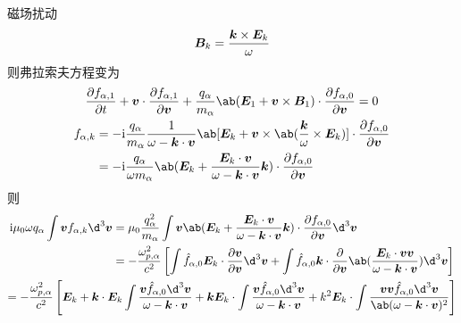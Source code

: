 磁场扰动
\begin{equation}
\bm{B}_k = \frac{\bm{k} \times \bm{E}_k}{\omega}
\end{equation}
则弗拉索夫方程变为
\begin{equation}\begin{gathered}
\pdv{f_{\alpha,1}}{t}
+ \vector{v} \cdot \pdv{f_{\alpha,1}}{\vector{v}}
+ \frac{q_\alpha}{m_\alpha} \ab(\vector{E}_1 + \vector{v}\times\vector{B}_1)
\cdot \pdv{f_{\alpha,0}}{\vector{v}}
= 0 \\
\begin{aligned}
f_{\alpha,k} &= -\im \frac{q_\alpha}{m_\alpha}
\frac{1}{\omega - \vector{k}\cdot\vector{v}} \ab[
\vector{E}_k + \vector{v} \times
\ab(\frac{\vector{k}}{\omega} \times \vector{E}_k)]
\cdot \pdv{f_{\alpha,0}}{\vector{v}} \\
&= -\im \frac{q_\alpha}{\omega m_\alpha} \ab(
    \vector{E}_k + \frac{\vector{E}_k \cdot \vector{v}}
    {\omega - \vector{k}\cdot\vector{v}} \vector{k}
) \cdot \pdv{f_{\alpha,0}}{\vector{v}}
\end{aligned}
\end{gathered}\end{equation}
则
\begin{equation}\begin{gathered}\begin{aligned}
\im\mu_0\omega q_\alpha \int \vector{v} f_{\alpha,k} \d^3\vector{v}
&= \mu_0 \frac{q_\alpha^2}{m_\alpha}
\int \vector{v} \ab(
    \vector{E}_k + \frac{\vector{E}_k \cdot \vector{v}}
    {\omega - \vector{k}\cdot\vector{v}} \vector{k}
)
\cdot \pdv{f_{\alpha,0}}{\vector{v}} \d^3\vector{v} \\
&= - \frac{\omega_{p,\alpha}^2}{c^2} \left[
\int \hat{f}_{\alpha,0} \vector{E}_k \cdot \pdv{\vector{v}}{\vector{v}} \d^3\vector{v}
+ \int \hat{f}_{\alpha,0} \vector{k} \cdot
    \pdv*{\ab(\frac{\vector{E}_k \cdot \vector{v}\vector{v}}
    {\omega-\vector{k}\cdot\vector{v}})}{\vector{v}}
\d^3\vector{v}
\right]\end{aligned} \\
= - \frac{\omega_{p,\alpha}^2}{c^2} \left[ \vector{E}_k
+ \vector{k} \cdot \vector{E}_k \int
    \frac{\vector{v} \hat{f}_{\alpha,0} \d^3\vector{v}}
    {\omega-\vector{k}\cdot\vector{v}}
+ \vector{k} \vector{E}_k \cdot \int
    \frac{\vector{v} \hat{f}_{\alpha,0} \d^3\vector{v}}
    {\omega-\vector{k}\cdot\vector{v}}
+ k^2 \vector{E}_k \cdot \int
    \frac{\vector{v}\vector{v} \hat{f}_{\alpha,0} \d^3\vector{v}}
    {\ab(\omega-\vector{k}\cdot\vector{v})^2}
\right]
\end{gathered}\end{equation}
